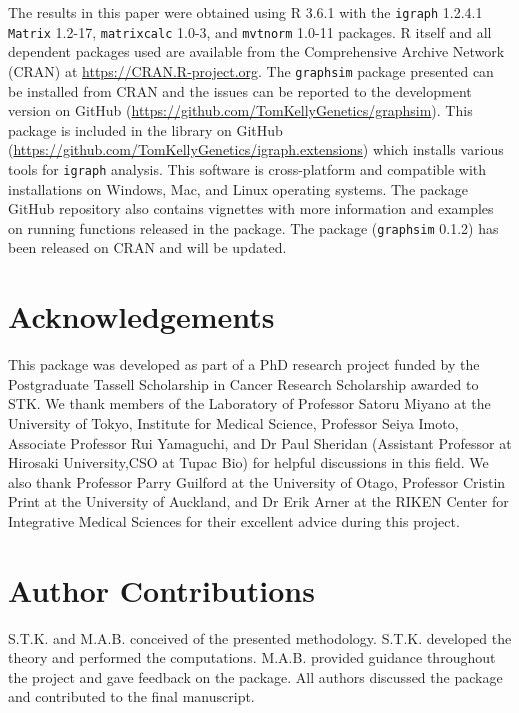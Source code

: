 \documentclass[]{article}
\begin{document}
The results in this paper were obtained using R 3.6.1 with the
\texttt{igraph} 1.2.4.1 \texttt{Matrix} 1.2-17, \texttt{matrixcalc}
1.0-3, and \texttt{mvtnorm} 1.0-11 packages. R itself and all dependent
packages used are available from the Comprehensive Archive Network
(CRAN) at \url{https://CRAN.R-project.org}. The \texttt{graphsim}
package presented can be installed from CRAN and the issues can be
reported to the development version on GitHub
(\url{https://github.com/TomKellyGenetics/graphsim}). This package is
included in the library on GitHub
(\url{https://github.com/TomKellyGenetics/igraph.extensions}) which
installs various tools for \texttt{igraph} analysis. This software is
cross-platform and compatible with installations on Windows, Mac, and
Linux operating systems. The package GitHub repository also contains
vignettes with more information and examples on running functions
released in the package. The package (\texttt{graphsim} 0.1.2) has been
released on CRAN and will be updated.

\hypertarget{acknowledgements}{%
\section*{Acknowledgements}\label{acknowledgements}}

This package was developed as part of a PhD research project funded by
the Postgraduate Tassell Scholarship in Cancer Research Scholarship
awarded to STK. We thank members of the Laboratory of Professor Satoru
Miyano at the University of Tokyo, Institute for Medical Science,
Professor Seiya Imoto, Associate Professor Rui Yamaguchi, and Dr Paul
Sheridan (Assistant Professor at Hirosaki University,CSO at Tupac Bio)
for helpful discussions in this field. We also thank Professor Parry
Guilford at the University of Otago, Professor Cristin Print at the
University of Auckland, and Dr Erik Arner at the RIKEN Center for
Integrative Medical Sciences for their excellent advice during this
project.

\hypertarget{contributions}{%
\section*{Author Contributions}\label{contributions}}

S.T.K. and M.A.B. conceived of the presented methodology. S.T.K.
developed the theory and performed the computations. M.A.B. provided
guidance throughout the project and gave feedback on the package. All
authors discussed the package and contributed to the final manuscript.
\end{document}
